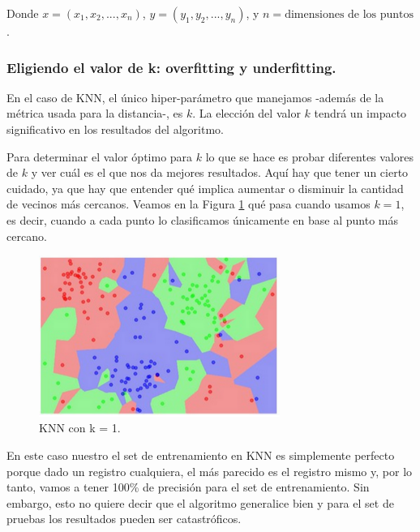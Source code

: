 \documentclass[12pt,a4paper]{article}
\begin{document}
\begin{sloppypar}
Donde $x=(x_{1},x_{2},..., x_{n})$, $y = (y_{1},y_{2},...,y_{n})$, y $n = \text{dimensiones de los puntos}$.

\cleardoublepage
\subsubsection{Eligiendo el valor de k: overfitting y underfitting.}

En el caso de KNN, el único hiper-parámetro que manejamos -además de la métrica usada para la distancia-, es $k$. La elección del valor $k$ tendrá un impacto significativo en los resultados del algoritmo. 

Para determinar el valor óptimo para $k$ lo que se hace es probar diferentes valores de $k$ y ver cuál es el que nos da mejores resultados. Aquí hay que tener un cierto cuidado, ya que hay que entender qué implica aumentar o disminuir la cantidad de vecinos más cercanos.
Veamos en la Figura \ref{fig:KNN_k_1} qué pasa cuando usamos $k = 1$, es decir, cuando a cada punto lo clasificamos únicamente en base al punto más cercano.

\begin{figure}[H]    %
 \centering
 \includegraphics[width=0.7\textwidth]{images/KNN_k_1.png}
 \captionsetup{justification=centering,margin=2cm}
 \caption{KNN con k = 1. \cite{apunte_uba}} 
 \label{fig:KNN_k_1}
\end{figure}

En este caso nuestro el set de entrenamiento en KNN es simplemente perfecto porque dado un registro cualquiera, el más parecido es el registro mismo y, por lo tanto, vamos a tener 100\% de precisión para el set de entrenamiento. Sin embargo, esto no quiere decir que el algoritmo generalice bien y para el set de pruebas los resultados pueden ser catastróficos.


\end{sloppypar}
\end{document}
